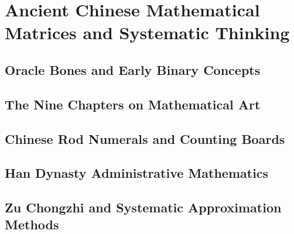 
\chapter{Ancient Chinese Mathematical Matrices and Systematic Thinking}

\section{Oracle Bones and Early Binary Concepts}

\section{The Nine Chapters on Mathematical Art}

\section{Chinese Rod Numerals and Counting Boards}

\section{Han Dynasty Administrative Mathematics}

\section{Zu Chongzhi and Systematic Approximation Methods}

